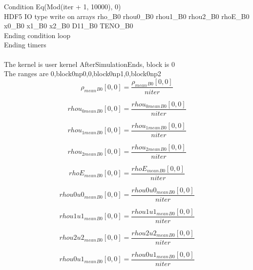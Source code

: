 \documentclass{article}
\begin{document}
\noindent Condition Eq(Mod(iter + 1, 10000), 0)\\\noindent HDF5 IO type write on arrays rho_B0 rhou0_B0 rhou1_B0 rhou2_B0 rhoE_B0 x0_B0 x1_B0 x2_B0 D11_B0 TENO_B0\\\noindent Ending condition loop %
\\\noindent Ending timers\\
\\\noindent The kernel is user kernel AfterSimulationEnds, block is 0\\\noindent The ranges are 0,block0np0,0,block0np1,0,block0np2\\\begin{dmath}{\rho_{mean}{_{B0}}}[{0,0}] = \frac{{\rho_{mean}{_{B0}}}[{0,0}]}{niter}\end{dmath}

\begin{dmath}{rhou_{0 mean}{_{B0}}}[{0,0}] = \frac{{rhou_{0 mean}{_{B0}}}[{0,0}]}{niter}\end{dmath}

\begin{dmath}{rhou_{1 mean}{_{B0}}}[{0,0}] = \frac{{rhou_{1 mean}{_{B0}}}[{0,0}]}{niter}\end{dmath}

\begin{dmath}{rhou_{2 mean}{_{B0}}}[{0,0}] = \frac{{rhou_{2 mean}{_{B0}}}[{0,0}]}{niter}\end{dmath}

\begin{dmath}{rhoE_{mean}{_{B0}}}[{0,0}] = \frac{{rhoE_{mean}{_{B0}}}[{0,0}]}{niter}\end{dmath}

\begin{dmath}{rhou0u0_{mean}{_{B0}}}[{0,0}] = \frac{{rhou0u0_{mean}{_{B0}}}[{0,0}]}{niter}\end{dmath}

\begin{dmath}{rhou1u1_{mean}{_{B0}}}[{0,0}] = \frac{{rhou1u1_{mean}{_{B0}}}[{0,0}]}{niter}\end{dmath}

\begin{dmath}{rhou2u2_{mean}{_{B0}}}[{0,0}] = \frac{{rhou2u2_{mean}{_{B0}}}[{0,0}]}{niter}\end{dmath}

\begin{dmath}{rhou0u1_{mean}{_{B0}}}[{0,0}] = \frac{{rhou0u1_{mean}{_{B0}}}[{0,0}]}{niter}\end{dmath}
\end{document}
